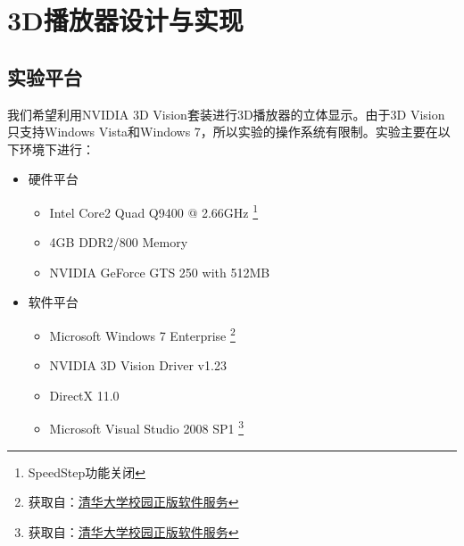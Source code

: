 

\cleardoublepage

\chapter{3D播放器设计与实现}
\label{cha:3Dplayerdesignandrealization}

\section{实验平台}
\label{sec:3dplayerhardwareplatform}



我们希望利用NVIDIA 3D Vision套装进行3D播放器的立体显示。由于3D Vision只支持Windows Vista和Windows 7，所以实验的操作系统有限制。实验主要在以下环境下进行：

\begin{itemize}
\item {硬件平台}

\begin{itemize}
\item Intel Core2 Quad Q9400 @ 2.66GHz
	\footnote{SpeedStep功能关闭}
\item 4GB DDR2/800 Memory
\item NVIDIA GeForce GTS 250 with 512MB
\end{itemize}

\item {软件平台}

\begin{itemize}
\item Microsoft Windows 7 Enterprise
	\footnote{获取自：\href{http://helpdesk.tsinghua.edu.cn/yhfw/yhfw_zbrj_tz.jsp}{清华大学校园正版软件服务}}
\item NVIDIA 3D Vision Driver v1.23
\item DirectX 11.0
\item Microsoft Visual Studio 2008 SP1
	\footnote{获取自：\href{http://helpdesk.tsinghua.edu.cn/yhfw/yhfw_zbrj_tz.jsp}{清华大学校园正版软件服务}}
\end{itemize}

\end{itemize}


